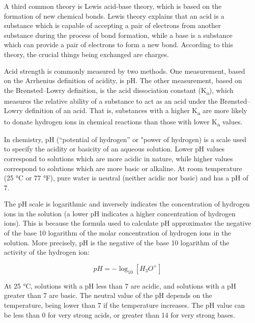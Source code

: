 \documentclass[
]{book}
\begin{document}
A third common theory is Lewis acid-base theory, which is based on the formation of new chemical bonds. Lewis theory explains that an acid is a substance which is capable of accepting a pair of electrons from another substance during the process of bond formation, while a base is a substance which can provide a pair of electrons to form a new bond. According to this theory, the crucial things being exchanged are charges.

Acid strength is commonly measured by two methods. One measurement, based on the Arrhenius definition of acidity, is pH. The other measurement, based on the Brønsted--Lowry definition, is the acid dissociation constant (K\textsubscript{a}), which measures the relative ability of a substance to act as an acid under the Brønsted--Lowry definition of an acid. That is, substances with a higher K\textsubscript{a} are more likely to donate hydrogen ions in chemical reactions than those with lower K\textsubscript{a} values.

In chemistry, pH (``potential of hydrogen'' or "power of hydrogen) is a scale used to specify the acidity or basicity of an aqueous solution. Lower pH values correspond to solutions which are more acidic in nature, while higher values correspond to solutions which are more basic or alkaline. At room temperature (25 °C or 77 °F), pure water is neutral (neither acidic nor basic) and has a pH of 7.

The pH scale is logarithmic and inversely indicates the concentration of hydrogen ions in the solution (a lower pH indicates a higher concentration of hydrogen ions). This is because the formula used to calculate pH approximates the negative of the base 10 logarithm of the molar concentration of hydrogen ions in the solution. More precisely, pH is the negative of the base 10 logarithm of the activity of the hydrogen ion:

\[pH = - \log_{10} [H_3O^+]\]

At 25 °C, solutions with a pH less than 7 are acidic, and solutions with a pH greater than 7 are basic. The neutral value of the pH depends on the temperature, being lower than 7 if the temperature increases. The pH value can be less than 0 for very strong acids, or greater than 14 for very strong bases.
\end{document}
